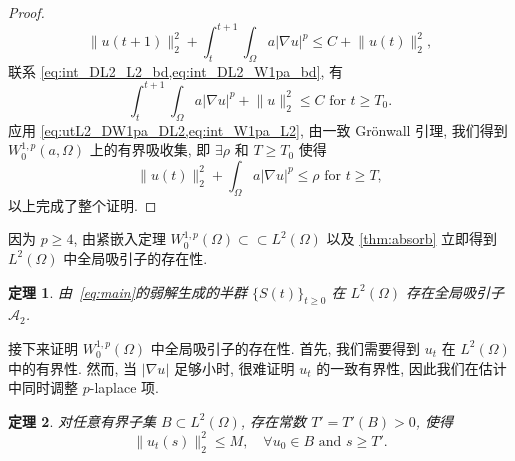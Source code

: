 \documentclass[oneside,longtitle]{LZUthesis}
\newtheorem{theorem}{定理}[chapter]
\theoremstyle{definition}
\numberwithin{equation}{chapter}
\newcommand*\abs[1]{\lvert#1\rvert}
\newcommand*\norm[1]{\lVert#1\rVert}
\newcommand*\Brace[1]{\lbrace#1\rbrace}
\begin{document}
\begin{proof}
\begin{equation}
		\norm{u(t+1)}_2^2
		+ \int_t^{t+1}\int_{\Omega}a \abs{\nabla u}^p
		\leq C + \norm{u(t)}_2^2,
	\end{equation}
	联系 \cref{eq:int_DL2_L2_bd,eq:int_DL2_W1pa_bd}, 有
	\begin{equation}\label{eq:int_W1pa_L2}
		\int_t^{t+1}\int_{\Omega}a \abs{\nabla u}^p
		+ \norm{u}_2^2 \leq C \text{ for } t \geq T_0.
	\end{equation}
	应用 \cref{eq:utL2_DW1pa_DL2,eq:int_W1pa_L2}, 由一致 Gr\"onwall 引理, 我们得到 $W_0^{1,p}(a,\Omega)$ 上的有界吸收集,
	即 $\exists \rho$ 和 $T \geq T_{0}$ 使得
	\begin{equation}\label{eq:uL2_W1pa_bd}
		\norm{u(t)}_2^2 + \int_{\Omega}a\abs{\nabla u}^p \leq \rho \text{ for } t \geq T,
	\end{equation}
	以上完成了整个证明.
\end{proof}
因为 $p \geq 4$, 由紧嵌入定理
$W_0^{1,p}(\Omega) \subset\subset L^2(\Omega)$
以及 \cref{thm:absorb} 立即得到 $L^2(\Omega)$ 中全局吸引子的存在性.
\begin{theorem}\label{thm:attractor_L2}
	由~\cref{eq:main}的弱解生成的半群 $\Brace{S(t)}_{t \geq 0}$ 在
	$L^2(\Omega)$ 存在全局吸引子 $\mathcal{A}_2$.
\end{theorem}
接下来证明 $W_0^{1,p}(\Omega)$ 中全局吸引子的存在性. 首先, 我们需要得到 $u_t$ 在 $L^2(\Omega)$ 中的有界性.
然而, 当 $\abs{\nabla u}$ 足够小时, 很难证明 $u_t$ 的一致有界性,
因此我们在估计中同时调整 $p$-laplace 项.
\begin{theorem}\label{thm:ut_L2_bd}
	对任意有界子集 $B \subset L^2(\Omega)$,
	存在常数 $T' = T'(B) > 0$, 使得
	\begin{equation}
		\norm{u_t(s)}_2^2 \leq M, \quad \forall u_0 \in B \text{ and } s \geq T'.
	\end{equation}
\end{theorem}
\end{document}
